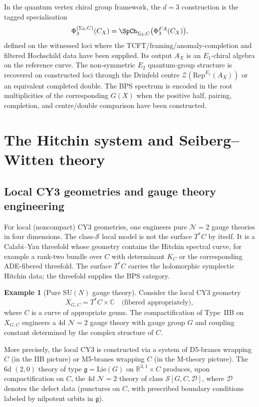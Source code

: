 \documentclass[11pt]{article}
\theoremstyle{definition}
\newtheorem{example}[theorem]{Example}
\theoremstyle{remark}
\newcommand{\cC}{\mathcal{C}}
\newcommand{\cN}{\mathcal{N}}
\newcommand{\cZ}{\mathcal{Z}}
\newcommand{\frakg}{\mathfrak{g}}
\newcommand{\Rep}{\mathrm{Rep}}
\newcommand{\SU}{\mathrm{SU}}
\newcommand{\Eone}{E_1}
\newcommand{\Etwo}{E_2}
\begin{document}
In the quantum vertex chiral group framework, the $d=3$ construction is the tagged specialisation
\[
 \Phi^{(\Sigma_2,C)}_3(\cC_X)
 = \SpCh_{\Sigma_2,C}\bigl(\Phi^{\mathrm{FA}}_3(\cC_X)\bigr),
\]
defined on the witnessed loci where the TCFT/framing/anomaly-completion and filtered Hochschild data have been supplied. Its output $A_X$ is an $\Eone$-chiral algebra on the reference curve. The non-symmetric $\Etwo$ quantum-group structure is recovered on constructed loci through the Drinfeld centre $\cZ(\Rep^{\Eone}(A_X))$ or an equivalent completed double. The BPS spectrum is encoded in the root multiplicities of the corresponding $G(X)$ when the positive half, pairing, completion, and centre/double comparison have been constructed.


\section{The Hitchin system and Seiberg--Witten theory}
\label{sec:hitchin-sw}

\subsection{Local CY3 geometries and gauge theory engineering}
\label{subsec:local-cy3}

For local (noncompact) CY3 geometries, one engineers pure $\cN=2$ gauge theories in four dimensions.
The class-$\mathcal S$ local model is not the surface $T^*C$ by itself. It is a Calabi--Yau threefold whose geometry contains the Hitchin spectral curve, for example a rank-two bundle over $C$ with determinant $K_C$ or the corresponding ADE-fibered threefold. The surface $T^*C$ carries the holomorphic symplectic Hitchin data; the threefold supplies the BPS category.

\begin{example}[Pure $\SU(N)$ gauge theory]
 \label{ex:pure-su-n}
 Consider the local CY3 geometry
 \begin{equation}
 \label{eq:local-cy3-sun}
 X_{G,C} = T^*C \times \mathbb{C} \quad \text{(fibered appropriately)},
 \end{equation}
 where $C$ is a curve of appropriate genus. The compactification of Type~IIB on $X_{G,C}$
 engineers a 4d $\cN=2$ gauge theory with gauge group $G$ and coupling constant determined
 by the complex structure of $C$.
\end{example}

More precisely, the local CY3 is constructed via a system of D5-branes wrapping $C$ (in the
IIB picture) or M5-branes wrapping $C$ (in the M-theory picture). The 6d $(2,0)$ theory of type
$\frakg = \mathrm{Lie}(G)$ on $\mathbb{R}^{3,1} \times C$ produces, upon compactification on $C$,
the 4d $\cN=2$ theory of class $\mathcal{S}[G, C, \mathcal{D}]$, where $\mathcal{D}$ denotes
the defect data (punctures on $C$, with prescribed boundary conditions labeled by nilpotent orbits
in $\frakg$).
\end{document}
